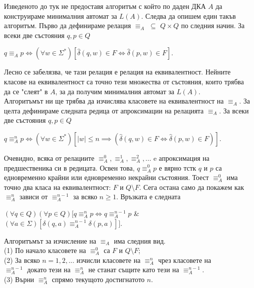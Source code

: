 \documentclass{article}
\begin{document}
    \vspace {15pt}

    \hspace{15pt} Изведеното до тук не предоставя алгоритъм с който по даден ДКА $A$
    да конструираме минималния автомат за $L(A)$. Следва да опишем един такъв алгоритъм.
    Първо да дефинираме релация 
    $\equiv_A$ $\subseteq$ $Q \times Q$ по следния начин. За всеки две състояния
    $q,p \in Q$
    \begin{center}
        $q \equiv_A p \iff (\forall w \in \Sigma^*)[\hat{\delta}(q,w) \in F \iff \hat{\delta}(p,w) \in F]$.
    \end{center}
    Лесно се забелязва, че тази релация е релация на еквивалентност. Нейните класове
    на еквивалентност са точно тези множества от състояния, които трябва да се "слеят"
    \hspace{0,01cm} в $A$, за да получим минималния автомат за $L(A)$. \\
    \hspace{15pt} Алгоритъмът ни ще трябва да изчислява класовете на еквивалентност на
    $\equiv_A$. За целта дефинираме следната редица от апроксимации на релацията 
    $\equiv_A$. За всеки две състояния $q,p \in Q$ 
    \begin{center}
        $q \equiv_A^n p \iff (\forall w \in \Sigma^*)[|w| \leq n \implies (\hat{\delta}(q,w) \in F \iff \hat{\delta}(p,w) \in F)]$.
    \end{center}
    \hspace{15pt} Очевидно, всяка от релациите $\equiv_A^0,\equiv_A^1,\equiv_A^2,...$
    e апроксимация на предшественика си в редицата. Освен това, $q \equiv_A^0 p$ е вярно
    тстк $q$ и $p$ са едновременно крайни или едновременно некрайни състояния. Тоест
    $\equiv_A^0$ има точно два класа на еквивалентност: $F$ и $Q \setminus F$. Сега
    остана само да покажем как $\equiv_A^n$ зависи от $\equiv_A^{n-1}$ за всяко
    $n \geq 1$. Връзката е следната
    \begin{center}
        $(\forall q \in Q)(\forall p \in Q)[q \equiv_A^n p \iff q \equiv_A^{n-1} p$ \& $(\forall a \in \Sigma)[\delta(q,a) \equiv_A^{n-1} \delta(p,a)]]$.
    \end{center}
    Алгоритъмът за изчисление на $\equiv_A$ има следния вид. \\
    \vspace{5pt}
    \hspace{15pt} (1) По начало класовете на $\equiv_A^0$ са $F$ и $Q \setminus F$; \\
    \hspace{15pt} (2) За всяко $n = 1,2,...$ изчисли класовете на $\equiv_A^n$ чрез класовете на \\
    \hspace{34pt}$\equiv_A^{n-1}$ докато тези на $\equiv_A^n$ не станат същите като тези на
    $\equiv_A^{n-1}$. \\
    \hspace{15pt} (3) Върни $\equiv_A^n$ спрямо текущото достигнатото $n$.
\end{document}
